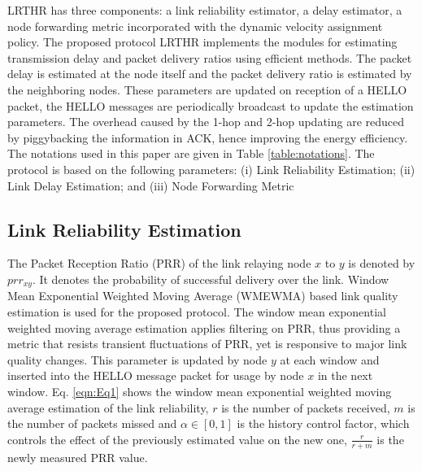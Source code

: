 \documentclass[fleqn,twoside]{article}
\begin{document}
LRTHR has three components: a link reliability estimator, a delay estimator, a node forwarding metric incorporated with the 
dynamic velocity assignment policy. The proposed protocol LRTHR implements the modules for estimating transmission delay and packet delivery ratios using efficient methods. The packet delay is estimated at the node itself and the packet delivery ratio is estimated by the neighboring nodes. These parameters are updated on reception of a HELLO packet, the HELLO messages are periodically broadcast to update the estimation parameters. The overhead caused by the 1-hop and 2-hop updating are reduced by piggybacking the information 
in ACK, hence improving the energy efficiency. The notations used in this paper are given in Table \ref{table:notations}. The protocol is based on the following parameters: (i) Link Reliability Estimation; (ii) Link Delay Estimation; and (iii) Node Forwarding Metric


\subsection{Link Reliability Estimation}
The Packet Reception Ratio (PRR) of the link relaying node $x$ to $y$ is denoted by $prr_{xy}$. It denotes the probability of successful 
delivery over the link. Window Mean Exponential Weighted Moving Average (WMEWMA) based link quality estimation is used for the proposed protocol. The window mean exponential weighted moving average estimation applies filtering on PRR, thus providing a metric that resists transient fluctuations of PRR, yet is responsive to major link quality changes.
\vskip 2mm
This parameter is updated by node $y$ at each window and inserted into the HELLO message packet for usage by node $x$ in the next window. 
Eq. \ref{eqn:Eq1} shows the window mean exponential weighted moving average estimation of the link reliability, $r$ is the number of packets received, $m$ is the number of packets missed and $\alpha \in [0,1]$ is the history control factor, which controls the effect of the previously estimated value on the new one, $\frac{r}{r+m}$ is the newly measured PRR value.
\end{document}
